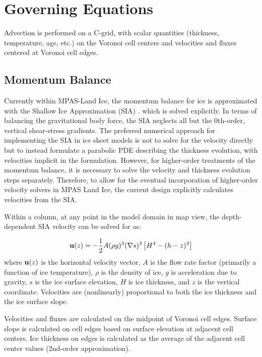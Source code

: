 \chapter{Governing Equations}
\label{chap:landice-intro}



Advection is performed on a C-grid, with scalar quantities (thickness, temperature, age, etc.) on the Voronoi cell centers and velocities and fluxes centered at Voronoi cell edges.

\section{Momentum Balance}

Currently within MPAS-Land Ice, the momentum balance for ice is approximated with the Shallow Ice Approximation (SIA) \citep{Hutter1983}.   which is solved explicitly.  In terms of balancing the gravitational body force, the SIA neglects all but the 0th-order, vertical shear-stress gradients.  The preferred numerical approach for implementing the SIA in ice sheet models is not to solve for the velocity directly but to instead formulate a parabolic PDE describing the thickness evolution, with velocities implicit in the formulation.  However, for higher-order treatments of the momentum balance, it is necessary to solve the velocity and thickness evolution steps separately. Therefore, to allow for the eventual incorporation of higher-order velocity solvers in MPAS Land Ice, the current design explicitly calculates velocities from the SIA.

Within a column, at any point in the model domain in map view, the depth-dependent SIA velocity can be solved for as:

\begin{equation}
    \label{sia}
	\mathbf{u}(z) = -\frac{1}{2} A (\rho g )^3 (\nabla s)^3 \left[H^4 - (h-z)^4 \right]
\end{equation}
where $\mathbf{u}(z)$ is the horizontal velocity vector, $A$ is the flow rate factor (primarily a function of ice temperature), $\rho$ is the density of ice, $g$ is acceleration due to gravity, $s$ is the ice surface elevation, $H$ is ice thickness, and $z$ is the vertical coordinate. Velocities are (nonlinearly) proportional to both the ice thickness and the ice surface slope.

Velocities and fluxes are calculated on the midpoint of Voronoi cell edges.  Surface slope is calculated on cell edges based on surface elevation at adjacent cell centers.  Ice thickness on edges is calculated as the average of the adjacent cell center values (2nd-order approximation).


